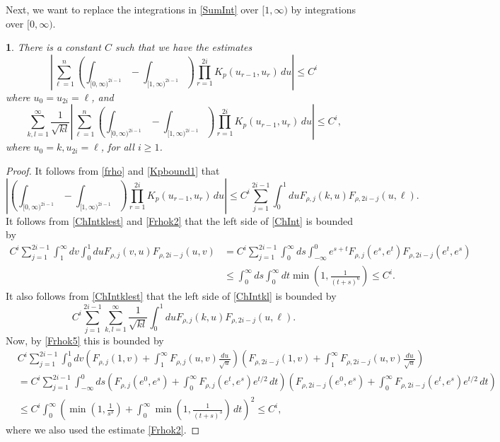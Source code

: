 \documentclass{article}
\numberwithin{equation}{section}
\numberwithin{figure}{section}
\theoremstyle{plain}
\theoremstyle{plain}
\newtheorem{lemma}[thm]{\protect\lemmaname}
\numberwithin{thm}{section}
\theoremstyle{remark}
\providecommand{\lemmaname}{Lemma}
\let \le \leqslant
\let \ge \geqslant
\begin{document}
Next, we want to replace the integrations in \eqref{SumInt} over $[1,\infty)$ by integrations over $[0,\infty)$.
\begin{lemma}\label{Lem:ChInt}
There is a constant $C$ such that we have the estimates
\begin{equation}\label{ChInt}
\left|\sum_{\ell=1}^n\left(\int_{[0,\infty)^{2i-1}}-\int_{[1,\infty)^{2i-1}}\right)\prod_{r=1}^{2i}K_p(u_{r-1},u_r)\,du\right|\le C^i
\end{equation}
where $u_0=u_{2i}=\ell$, and
\begin{equation}\label{ChIntkl}
\sum_{k,l=1}^\infty\frac 1{\sqrt{kl}}
\left|\sum_{\ell=1}^n\left(\int_{[0,\infty)^{2i-1}}-\int_{[1,\infty)^{2i-1}}\right)\prod_{r=1}^{2i}K_p(u_{r-1},u_r)\,du\right|\le C^i,
\end{equation}
where $u_0=k, u_{2i}=\ell$, for all $i\ge 1$.
\end{lemma}




\begin{proof}
It follows from \eqref{frho} and \eqref{Kpbound1} that 
\begin{equation}\label{ChIntklest}
\left|\left(\int_{[0,\infty)^{2i-1}}-\int_{[1,\infty)^{2i-1}}\right)\prod_{r=1}^{2i}K_p(u_{r-1},u_r)\,du\right|\le
C^i\sum_{j=1}^{2i-1}\int_0^1duF_{\rho,j}(k,u)F_{\rho,2i-j}(u,\ell).
\end{equation}
It follows from \eqref{ChIntklest} and \eqref{Frhok2} that the left side of \eqref{ChInt} is bounded by
\begin{align*}
C^i\sum_{j=1}^{2i-1}\int_1^\infty dv\int_0^1duF_{\rho,j}(v,u)F_{\rho,2i-j}(u,v) &=   C^i\sum_{j=1}^{2i-1}\int_0^\infty ds\int_{-\infty}^0 e^{s+t}F_{\rho,j}(e^s,e^t)F_{\rho,2i-j}(e^t,e^s)\\
&\le \int_0^\infty ds\int_0^\infty dt\min(1,\frac 1{(t+s)^6})\le C^i.
\end{align*}
It also follows from \eqref{ChIntklest} that the left side of \eqref{ChIntkl} is bounded by
\begin{equation*}
    C^i\sum_{j=1}^{2i-1}\sum_{k,l=1}^\infty\frac 1{\sqrt{kl}}\int_0^1duF_{\rho,j}(k,u)F_{\rho,2i-j}(u,\ell).
\end{equation*}
Now, by \eqref{Frhok5} this is bounded by
\begin{align*}
    &C^i\sum_{j=1}^{2i-1}\int_0^1dv\left(F_{\rho,j}(1,v)+\int_{1}^\infty F_{\rho,j}(u,v)\frac{du}{\sqrt{u}}\right)\left(F_{\rho,2i-j}(1,v)+\int_{1}^\infty F_{\rho,2i-j}(u,v)\frac{du}{\sqrt{u}}\right)\\
    &=C^i\sum_{j=1}^{2i-1}\int_{-\infty}^0ds\left(F_{\rho,j}(e^0,e^s)+ \int_0^\infty F_{\rho,j}(e^t,e^s)e^{t/2}\,dt\right)\left(F_{\rho,2i-j}(e^0,e^s)+ \int_0^\infty F_{\rho,2i-j}(e^t,e^s)e^{t/2}\,dt\right)\\ &\le C^i\int_0^\infty\left(\min(1,\frac 1{s^3})+\int_0^\infty\min(1,\frac 1{(t+s)^3})\,dt\right)^2\le C^i,
    \end{align*}
where we also used the estimate \eqref{Frhok2}.
\end{proof}
\end{document}
